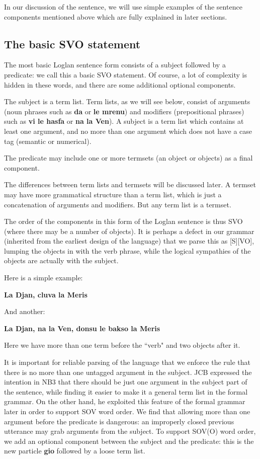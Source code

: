 \documentclass[12pt]{book}
\begin{document}
{In our discussion of the sentence, we will use simple examples of the sentence components mentioned above which are fully explained in later sections.

\subsection{The basic SVO statement}

The most basic Loglan sentence form consists of a subject followed by a predicate:  we call this a basic SVO statement.  Of course, a lot of complexity is hidden in these words,
and there are some additional optional components.

The subject is a term list.  Term lists, as we will see below, consist of arguments (noun phrases such as {\bf da} or {\bf le mrenu}) and modifiers (prepositional phrases) such as {\bf vi le hasfa} or {\bf na la Ven}).  A subject is a term list which contains at least one argument, and no more than one argument which does not have a case tag (semantic or numerical).  

The predicate may include one or more termsets (an object or objects) as a final component.

The differences between term lists and termsets will be discussed later.  A termset may have more grammatical structure than a term list, which
is just a concatenation of arguments and modifiers.  But any term list is a termset.

The order of the components in this form of the Loglan sentence is thus SVO (where there may be a number of objects).  It is perhaps a defect in our grammar
(inherited from the earliest design of the language) that we parse this as [S][VO], lumping the objects in with the verb phrase, while the logical sympathies of the objects are actually with the subject.

Here is a simple example:

{\bf La Djan, cluva la Meris}

And another:

{\bf La Djan, na la Ven, donsu le bakso la Meris}

Here we have more than one term before the ``verb" and two objects after it.

It is important for reliable parsing of the language that we enforce the rule that there is no more than one untagged argument in the subject.  JCB
expressed the intention in NB3 that there should be just one argument in the subject part of the sentence, while finding it easier to make it a general term list in the formal  grammar.  On the other hand, he exploited this feature of the formal grammar  later in order to support SOV word order.  We find that allowing more than one argument
before the predicate is dangerous:  an improperly closed previous utterance may grab arguments from the subject.  To support SOV(O) word order,
we add an optional component between the subject and the predicate:  this is the new particle {\bf gio} followed by a loose term list.

}
\end{document}
